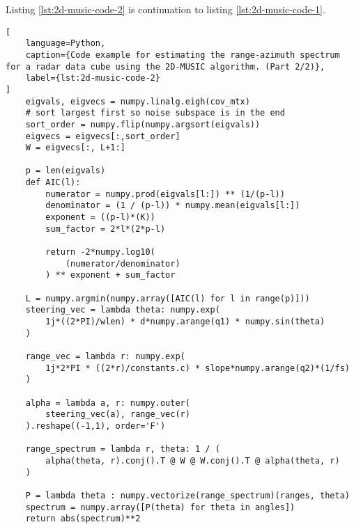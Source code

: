Listing \ref{lst:2d-music-code-2} is continuation to listing \ref{lst:2d-music-code-1}.
\begin{lstlisting}[
    language=Python,
    caption={Code example for estimating the range-azimuth spectrum for a radar data cube using the 2D-MUSIC algorithm. (Part 2/2)},
    label={lst:2d-music-code-2}
]
    eigvals, eigvecs = numpy.linalg.eigh(cov_mtx)
    # sort largest first so noise subspace is in the end
    sort_order = numpy.flip(numpy.argsort(eigvals))
    eigvecs = eigvecs[:,sort_order]
    W = eigvecs[:, L+1:]

    p = len(eigvals)
    def AIC(l):
        numerator = numpy.prod(eigvals[l:]) ** (1/(p-l))
        denominator = (1 / (p-l)) * numpy.mean(eigvals[l:])
        exponent = ((p-l)*(K))
        sum_factor = 2*l*(2*p-l)

        return -2*numpy.log10(
            (numerator/denominator)
        ) ** exponent + sum_factor

    L = numpy.argmin(numpy.array([AIC(l) for l in range(p)]))
    steering_vec = lambda theta: numpy.exp(
        1j*((2*PI)/wlen) * d*numpy.arange(q1) * numpy.sin(theta)
    )
    
    range_vec = lambda r: numpy.exp(
        1j*2*PI * ((2*r)/constants.c) * slope*numpy.arange(q2)*(1/fs)
    )
    
    alpha = lambda a, r: numpy.outer(
        steering_vec(a), range_vec(r)
    ).reshape((-1,1), order='F')
    
    range_spectrum = lambda r, theta: 1 / (
        alpha(theta, r).conj().T @ W @ W.conj().T @ alpha(theta, r)
    )
    
    P = lambda theta : numpy.vectorize(range_spectrum)(ranges, theta)
    spectrum = numpy.array([P(theta) for theta in angles])
    return abs(spectrum)**2
\end{lstlisting}